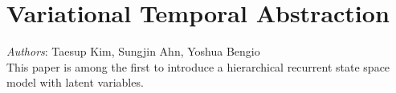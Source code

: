 \section{Variational Temporal Abstraction}
\textit{Authors}: Taesup Kim, Sungjin Ahn, Yoshua Bengio \cite{kim_variational_2019} \\

This paper is among the first to introduce a hierarchical recurrent state space model with latent variables. 
